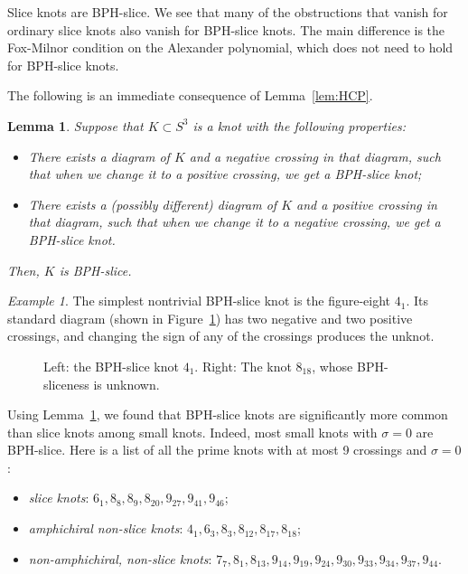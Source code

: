 \documentclass [11pt]{amsart}
\newtheorem {lemma}[theorem]{Lemma}
\theoremstyle{remark}
\newtheorem {example}[theorem]{Example}
\begin{document}
Slice knots are BPH-slice. We see that many of the obstructions that vanish for ordinary slice knots also vanish for BPH-slice knots. The main difference is the Fox-Milnor condition on the Alexander polynomial, which does not need to hold for BPH-slice knots.

The following is an immediate consequence of Lemma~\ref{lem:HCP}. 
\begin{lemma}
\label{lem:ConstructBPH}
Suppose that $K \subset S^3$ is a knot with the following properties:
\begin{itemize}
\item There exists a diagram of $K$ and a negative crossing in that diagram, such that when we change it to a positive crossing, we get a BPH-slice knot;
\item There exists a (possibly different) diagram of $K$ and a positive crossing in that diagram, such that when we change it to a negative crossing, we get a BPH-slice knot.
\end{itemize}
Then, $K$ is BPH-slice.
\end{lemma}

\begin{example}
The simplest nontrivial BPH-slice knot is the figure-eight $4_1$. Its standard diagram (shown in  Figure~\ref{fig:41818}) has two negative and two positive crossings, and changing the sign of any of the crossings produces the unknot.
\end{example}

\begin{figure}

{
   \fontsize{9pt}{11pt}\selectfont
   \def\svgwidth{3.5in}
   
}
\caption{Left: the BPH-slice knot $4_1$. Right: The knot $8_{18}$, whose BPH-sliceness is unknown.}
\label{fig:41818}
\end{figure}


Using Lemma~\ref{lem:ConstructBPH}, we found that BPH-slice knots are significantly more common than slice knots among small knots. Indeed, most small knots with $\sigma=0$ are BPH-slice. Here is a list of all the prime knots with at most 9 crossings and $\sigma=0$:
\begin{itemize}
\item {\em slice knots}: $6_1, 8_8, 8_9, 8_{20}, 9_{27}, 9_{41}, 9_{46}$; 
\item {\em amphichiral non-slice knots}: $4_1, 6_3, 8_3, 8_{12}, 8_{17}, 8_{18}$;
\item {\em non-amphichiral, non-slice knots}: $7_7, 8_1, 8_{13}, 9_{14}, 9_{19}, 9_{24}, 9_{30}, 9_{33}, 9_{34}, 9_{37}, 9_{44}$.
\end{itemize}
\end{document}
